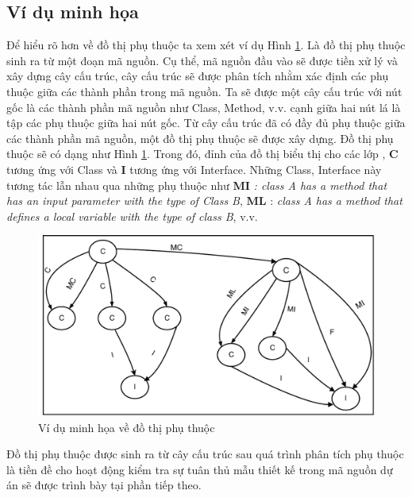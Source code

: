 \documentclass[12pt]{report}
\begin{document}
\subsection{Ví dụ minh họa}
\noindent Để hiểu rõ hơn về đồ thị phụ thuộc ta xem xét ví dụ Hình \ref{fig:example_graph_dependency}. Là đồ thị phụ thuộc sinh ra từ một đoạn mã nguồn. Cụ thể, mã nguồn đầu vào sẽ được tiền xử lý và xây dựng cây cấu trúc, cây cấu trúc sẽ được phân tích nhằm xác định các phụ thuộc giữa các thành phần trong mã nguồn. Ta sẽ được một cây cấu trúc với nút gốc là các thành phần mã nguồn như Class, Method, v.v. cạnh giữa hai nút lá là tập các phụ thuộc giữa hai nút gốc. Từ cây cấu trúc đã có đầy đủ phụ thuộc giữa các thành phần mã nguồn, một đồ thị phụ thuộc sẽ được xây dựng. Đồ thị phụ thuộc sẽ có dạng như Hình \ref{fig:example_graph_dependency}.
Trong đó, đỉnh của đồ thị biểu thị cho các lớp , \textbf{C} tương ứng với Class và \textbf{I} tương ứng với Interface. Những Class, Interface này tương tác lẫn nhau qua những phụ thuộc như \textbf{MI} \textit{: class A has a method that has an input parameter with the type of Class B}, \textbf{ML} : \textit{class A has a method that defines a local variable with the type of class B}, v.v.\\
\begin{figure}[!htbp]
	\centering
	\vspace{-0.5cm}
	\includegraphics[scale=0.9]{images/dependency_graph.pdf}
	\vspace{-0.5cm}
	\caption{Ví dụ minh họa về đồ thị phụ thuộc}
	\label{fig:example_graph_dependency}
\end{figure}

\noindent Đồ thị phụ thuộc được sinh ra từ cây cấu trúc sau quá trình phân tích phụ thuộc là tiền đề cho hoạt động kiểm tra sự tuân thủ mẫu thiết kế trong mã nguồn dự án sẽ được trình bày tại phần tiếp theo.
\end{document}
